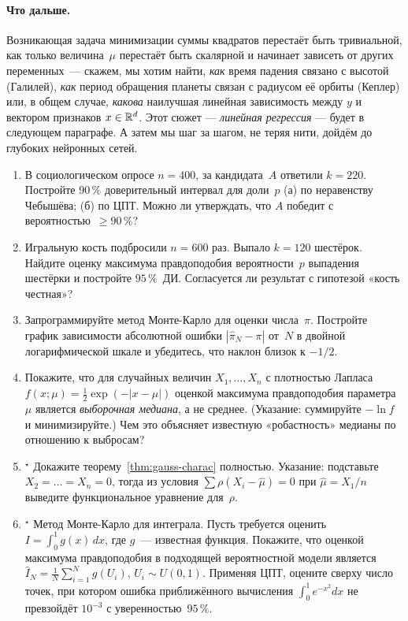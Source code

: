 \paragraph{Что дальше.}
Возникающая задача минимизации суммы квадратов перестаёт быть
тривиальной, как только величина~$\mu$ перестаёт быть скалярной и
начинает зависеть от других переменных~--- скажем, мы хотим найти,
\emph{как} время падения связано с высотой (Галилей), \emph{как} период
обращения планеты связан с радиусом её орбиты (Кеплер) или, в общем
случае, \emph{какова} наилучшая линейная зависимость между $y$ и
вектором признаков $x\in\mathbb{R}^{d}$. Этот сюжет — \emph{линейная регрессия} —
будет в следующем параграфе. А затем мы шаг за шагом, не теряя нити,
дойдём до глубоких нейронных сетей.

\begin{tasksbox}
\begin{enumerate}\itemsep1pt
  \item В социологическом опросе $n=400$, за кандидата~$A$ ответили
        $k=220$. Постройте $90\,\%$ доверительный интервал для доли~$p$
        (а) по неравенству Чебышёва; (б) по ЦПТ. Можно ли утверждать,
        что $A$ победит с вероятностью~$\geq 90\,\%$?
  \item Игральную кость подбросили $n=600$ раз. Выпало $k=120$ шестёрок.
        Найдите оценку максимума правдоподобия вероятности~$p$ выпадения
        шестёрки и постройте $95\,\%$~ДИ. Согласуется ли результат с
        гипотезой «кость честная»?
  \item Запрограммируйте метод Монте-Карло для оценки числа~$\pi$. Постройте
        график зависимости абсолютной ошибки $|\hat\pi_N-\pi|$ от~$N$ в
        двойной логарифмической шкале и убедитесь, что наклон близок к
        $-1/2$.
  \item Покажите, что для случайных величин $X_1,\dots,X_n$ с плотностью
        Лапласа $f(x;\mu)=\frac{1}{2}\exp(-|x-\mu|)$ оценкой максимума
        правдоподобия параметра~$\mu$ является \emph{выборочная медиана},
        а не среднее. (Указание: суммируйте $-\ln f$ и минимизируйте.)
        Чем это объясняет известную «робастность» медианы по отношению к
        выбросам?
  \item$^{\star}$ Докажите теорему~\ref{thm:gauss-charac} полностью.
        Указание: подставьте $X_2=\dots=X_n=0$, тогда из условия
        $\sum\rho(X_i-\hat\mu)=0$ при $\hat\mu=X_1/n$ выведите функциональное
        уравнение для~$\rho$.
  \item$^{\star}$ Метод Монте-Карло для интеграла. Пусть требуется
        оценить $I=\int_{0}^{1} g(x)\,dx$, где $g$~--- известная функция.
        Покажите, что оценкой максимума правдоподобия в подходящей
        вероятностной модели является
        $\hat I_N=\frac{1}{N}\sum_{i=1}^{N}g(U_i)$, $U_i\sim U(0,1)$.
        Применяя ЦПТ, оцените сверху число точек, при котором ошибка
        приближённого вычисления $\int_{0}^{1}e^{-x^{2}}dx$ не
        превзойдёт $10^{-3}$ с уверенностью~$95\,\%$.
\end{enumerate}
\end{tasksbox}

